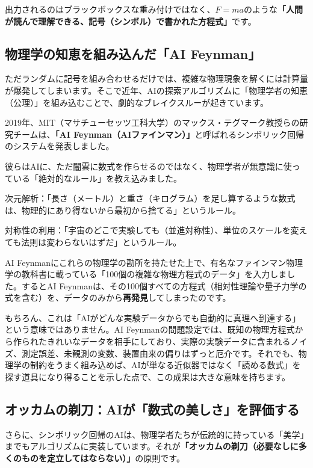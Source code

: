 出力されるのはブラックボックスな重み付けではなく、\(F=ma\)のような\textbf{「人間が読んで理解できる、記号（シンボル）で書かれた方程式」}です。

\subsection{物理学の知恵を組み込んだ「AI Feynman」}

ただランダムに記号を組み合わせるだけでは、複雑な物理現象を解くには計算量が爆発してしまいます。そこで近年、AIの探索アルゴリズムに「物理学者の知恵（公理）」を組み込むことで、劇的なブレイクスルーが起きています。

2019年、MIT（マサチューセッツ工科大学）のマックス・テグマーク教授らの研究チームは、\textbf{「AI Feynman（AIファインマン）」}と呼ばれるシンボリック回帰のシステムを発表しました。

彼らはAIに、ただ闇雲に数式を作らせるのではなく、物理学者が無意識に使っている「絶対的なルール」を教え込みました。

次元解析：「長さ（メートル）と重さ（キログラム）を足し算するような数式は、物理的にあり得ないから最初から捨てる」というルール。

対称性の利用：「宇宙のどこで実験しても（並進対称性）、単位のスケールを変えても法則は変わらないはずだ」というルール。

AI Feynmanにこれらの物理学の勘所を持たせた上で、有名なファインマン物理学の教科書に載っている「100個の複雑な物理方程式のデータ」を入力しました。するとAI Feynmanは、その100個すべての方程式（相対性理論や量子力学の式を含む）を、データのみから\textbf{再発見}してしまったのです。

もちろん、これは「AIがどんな実験データからでも自動的に真理へ到達する」という意味ではありません。AI Feynmanの問題設定では、既知の物理方程式から作られたきれいなデータを相手にしており、実際の実験データに含まれるノイズ、測定誤差、未観測の変数、装置由来の偏りはずっと厄介です。それでも、物理学の制約をうまく組み込めば、AIが単なる近似器ではなく「読める数式」を探す道具になり得ることを示した点で、この成果は大きな意味を持ちます。

\subsection{オッカムの剃刀：AIが「数式の美しさ」を評価する}

さらに、シンボリック回帰のAIは、物理学者たちが伝統的に持っている「美学」までもアルゴリズムに実装しています。それが\textbf{「オッカムの剃刀（必要なしに多くのものを定立してはならない）」}の原則です。

